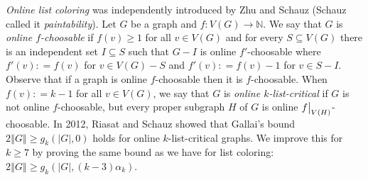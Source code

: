 \documentclass[12pt]{article}
\theoremstyle{plain}
\theoremstyle{definition}
\theoremstyle{remark}
\newcommand{\IN}{\mathbb{N}}
\newcommand{\card}[1]{\left|#1\right|}
\newcommand{\size}[1]{\left\Vert#1\right\Vert}
\newcommand{\func}[3]{#1\colon #2 \rightarrow #3}
\newcommand{\DefinedAs}{\mathrel{\mathop:}=}
\newcommand{\col}{\operatorname{col}}
\newcommand\restr[2]{{%
  \left.\kern-\nulldelimiterspace %
  #1 %
  \vphantom{\big|} %
  \right|_{#2} %
  }}
\begin{document}
\emph{Online list coloring} was independently introduced by Zhu \cite{zhu2009online} and Schauz \cite{schauz2009mr} (Schauz called it \emph{paintability}). Let $G$ be a graph and $\func{f}{V(G)}{\IN}$.  We say that $G$ is \emph{online $f$-choosable} if $f(v) \ge 1$ for all $v \in V(G)$ and for every $S \subseteq V(G)$ there is an independent set $I \subseteq S$ such that $G-I$ is online $f'$-choosable where $f'(v) \DefinedAs f(v)$ for $v \in V(G) - S$ and $f'(v) \DefinedAs f(v) - 1$ for $v \in S - I$.
Observe that if a graph is online $f$-choosable then it is $f$-choosable. 
When $f(v) \DefinedAs k-1$ for all $v \in V(G)$, we say that $G$ is \emph{online $k$-list-critical} if $G$ is not online $f$-choosable, 
but every proper subgraph $H$ of $G$ is online $\restr{f}{V(H)}$-choosable.  In 2012, Riasat and Schauz \cite{riasat2012critically} showed that Gallai's bound  $2\size{G} \ge g_k(\card{G}, 0)$ holds for online $k$-list-critical graphs.  We improve this for $k \ge 7$ by proving the same bound as we have for list coloring: $2\size{G} \ge g_k(\card{G}, (k-3)\alpha_k)$.


\end{document}
